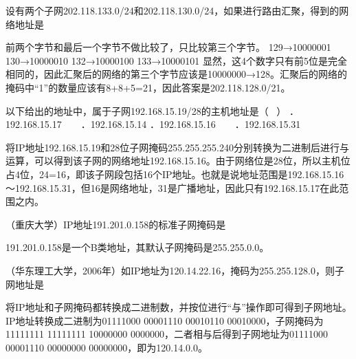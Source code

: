 \question 设有两个子网202.118.133.0/24和202.118.130.0/24，如果进行路由汇聚，得到的网络地址是
\par{}
\begin{solution}前两个字节和最后一个字节不做比较了，只比较第三个字节。 129→10000001
130→10000010 132→10000100 133→10000101
显然，这4个数字只有前5位是完全相同的，因此汇聚后的网络的第三个字节应该是10000000→128。汇聚后的网络的掩码中``1''的数量应该有8+8+5=21，因此答案是202.118.128.0/21。
\end{solution}
\question 以下给出的地址中，属于子网192.168.15.19/28的主机地址是（ ~）
．192.168.15.17 ~ ~ ．192.168.15.14 ．192.168.15.16 ~ ~
．192.168.15.31
\par{}
\begin{solution}将IP地址192.168.15.19和28位子网掩码255.255.255.240分别转换为二进制后进行与运算，可以得到该子网的网络地址192.168.15.16。由于网络位是28位，所以主机位占4位，24=16，即该子网段包括16个IP地址。也就是说地址范围是192.168.15.16～192.168.15.31，但16是网络地址，31是广播地址，因此只有192.168.15.17在此范围之内。
\end{solution}
\question （重庆大学）IP地址191.201.0.158的标准子网掩码是
\par{}
\begin{solution}191.201.0.158是一个B类地址，其默认子网掩码是255.255.0.0。
\end{solution}
\question （华东理工大学，2006年）如IP地址为120.14.22.16，掩码为255.255.128.0，则子网地址是
\par{}
\begin{solution}将IP地址和子网掩码都转换成二进制数，并按位进行``与''操作即可得到子网地址。IP地址转换成二进制为01111000
00001110 00010110 00010000，子网掩码为11111111 11111111 10000000
0000000，二者相与后得到子网地址为01111000 00001110 00000000
00000000，即为120.14.0.0。
\end{solution}
